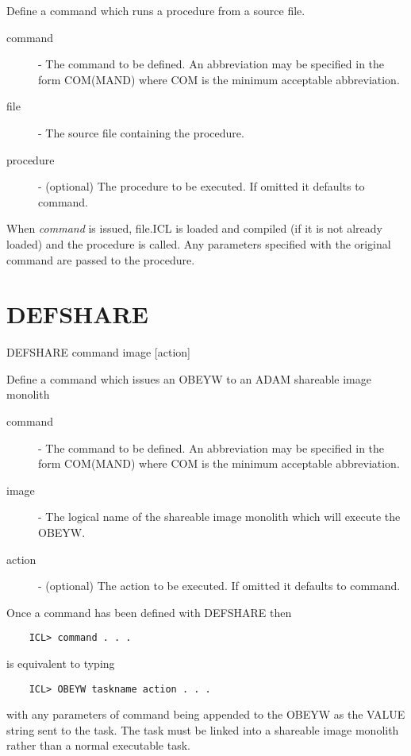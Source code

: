 \documentclass[twoside,11pt]{report}
\newcommand{\xlabel}[1]{}
\begin{document}
 Define a command which runs a procedure from a source file.

\begin{description}

\item[command] - The command to be defined. An abbreviation
              may be specified in the form COM(MAND) where
              COM is the minimum acceptable abbreviation.

\item[file]  - The source file containing the procedure.

\item[procedure] - (optional)  The procedure to be executed. If
              omitted it defaults to command.

\end{description}

When {\em command} is issued, file.ICL is loaded and compiled (if it is
not already loaded) and the procedure is called. Any parameters specified
with the original command are passed to the procedure.

\section{\xlabel{DEFSHARE}DEFSHARE\label{DEFSHARE}}

   DEFSHARE \hspace{.5cm} command \hspace{.5cm} image \hspace{.5cm} [action]

 Define a command which issues an OBEYW to an ADAM shareable image monolith

\begin{description}

\item[command] - The command to be defined. An abbreviation
              may be specified in the form COM(MAND) where
              COM is the minimum acceptable abbreviation.

\item[image] - The logical name of the shareable image monolith
               which will execute the OBEYW.

\item[action] - (optional)  The action to be executed. If
              omitted it defaults to command.

\end{description}
Once a command has been defined with DEFSHARE then
\begin{verbatim}
    ICL> command . . .
\end{verbatim}
is equivalent to typing
\begin{verbatim}
    ICL> OBEYW taskname action . . .
\end{verbatim}
with any parameters of command being appended to the OBEYW as the VALUE
string sent to the task. The task must be linked into a shareable image
monolith rather than a normal executable task.
\end{document}
